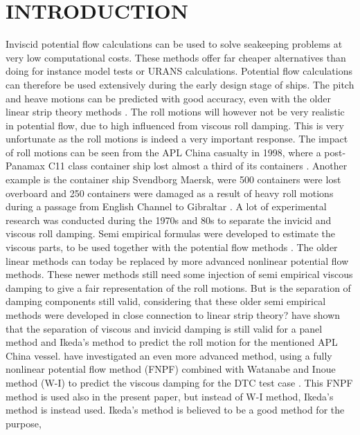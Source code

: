 \section*{INTRODUCTION}\label{introduction}
Inviscid potential flow calculations can be used to solve seakeeping
problems at very low computational costs. These methods offer far
cheaper alternatives than doing for instance model tests or URANS
calculations. Potential flow calculations can therefore be used
extensively during the early design stage of ships. The pitch and heave
motions can be predicted with good accuracy, even with the older linear
strip theory methods \citep{7505983/FB64RGPF}. The roll motions will
however not be very realistic in potential flow, due to high influenced
from viscous roll damping. This is very unfortunate as the roll motions
is indeed a very important response. The impact of roll motions can be
seen from the APL China casualty in 1998, where a post-Panamax C11 class
container ship lost almost a third of its containers
\citep{7505983/WPADAQB3}. Another example is the container ship Svendborg
Maersk, were 500 containers were lost overboard and 250 containers were
damaged as a result of heavy roll motions during a passage from English
Channel to Gibraltar \citep{7505983/T78CMTDR}.
\quad A lot of experimental research was conducted during the 1970s and
80s to separate the invicid and viscous roll damping. Semi empirical
formulas were developed to estimate the viscous parts, to be used
together with the potential flow methods \citep{7505983/937PN5DT}. The
older linear methods can today be replaced by more advanced nonlinear
potential flow methods. These newer methods still need some injection of
semi empirical viscous damping to give a fair representation of the roll
motions. But is the separation of damping components still valid,
considering that these older semi empirical methods were developed in
close connection to linear strip theory? \citep{7505983/UGK6YEVD} have
shown that the separation of viscous and invicid damping is still valid
for a panel method and Ikeda's method to predict the roll motion for the
mentioned APL China vessel. \citep{7505983/24TNAV5Z} have investigated an
even more advanced method, using a fully nonlinear potential flow method
(FNPF) \citep{7505983/P4XDUMMQ} combined with Watanabe and Inoue method
(W-I) \citep{7505983/ARMIRMVY} to predict the viscous damping for the DTC
test case \citep{7505983/BYNJ8CFG}. This FNPF method is used also in the
present paper, but instead of W-I method, Ikeda's method is instead
used. Ikeda's method is believed to be a good method for the purpose,
